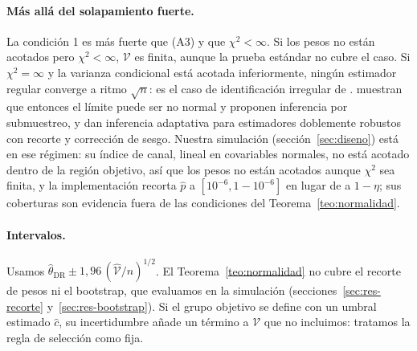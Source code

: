 \paragraph{Más allá del solapamiento fuerte.} La condición 1 es más fuerte que (A3) y que $\chi^2<\infty$. Si los pesos no están acotados pero $\chi^2<\infty$, $\mathcal V$ es finita, aunque la prueba estándar no cubre el caso. Si $\chi^2=\infty$ y la varianza condicional está acotada inferiormente, ningún estimador regular converge a ritmo $\sqrt n$: es el caso de identificación irregular de \citet{khan2010}. \citet{ma2020} muestran que entonces el límite puede ser no normal y proponen inferencia por submuestreo, y \citet{ma2023} dan inferencia adaptativa para estimadores doblemente robustos con recorte y corrección de sesgo. Nuestra simulación (sección~\ref{sec:diseno}) está en ese régimen: su índice de canal, lineal en covariables normales, no está acotado dentro de la región objetivo, así que los pesos no están acotados aunque $\chi^2$ sea finita, y la implementación recorta $\hat p$ a $[10^{-6},1-10^{-6}]$ en lugar de a $1-\eta$; sus coberturas son evidencia fuera de las condiciones del Teorema~\ref{teo:normalidad}.

\paragraph{Intervalos.} Usamos $\hat\theta_{\mathrm{DR}}\pm1,96\,(\hat{\mathcal V}/n)^{1/2}$. El Teorema~\ref{teo:normalidad} no cubre el recorte de pesos ni el bootstrap, que evaluamos en la simulación (secciones~\ref{sec:res-recorte} y~\ref{sec:res-bootstrap}). Si el grupo objetivo se define con un umbral estimado $\hat c$, su incertidumbre añade un término a $\mathcal V$ que no incluimos: tratamos la regla de selección como fija.
